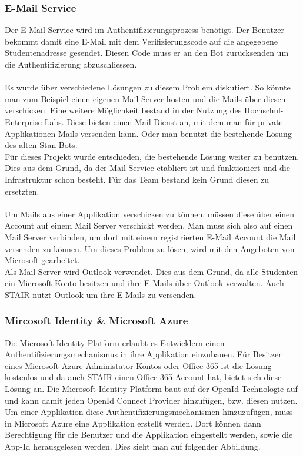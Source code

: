 \documentclass[a4paper, table]{article}
\begin{document}
\subsubsection{E-Mail Service}
Der E-Mail Service wird im Authentifizierungsprozess benötigt.
Der Benutzer bekommt damit eine E-Mail mit dem Verifizierungscode auf die angegebene Studentenadresse gesendet.
Diesen Code muss er an den Bot zurücksenden um die Authentifizierung abzuschliessen.\\\\
Es wurde über verschiedene Lösungen zu diesem Problem diskutiert.
So könnte man zum Beispiel einen eigenen Mail Server hosten und die Mails über diesen verschicken.
Eine weitere Möglichkeit bestand in der Nutzung des Hochschul-Enterprise-Labs.
Diese bieten einen Mail Dienst an, mit dem man für private Applikationen Mails versenden kann.
Oder man benutzt die bestehende Lösung des alten Stan Bots.\\
Für dieses Projekt wurde entschieden, die bestehende Lösung weiter zu benutzen.
Dies aus dem Grund, da der Mail Service etabliert ist und funktioniert und die Infrastruktur schon besteht.
Für das Team bestand kein Grund diesen zu ersetzten.\\\\
Um Mails aus einer Applikation verschicken zu können, müssen diese über einen Account auf einem Mail Server verschickt werden.
Man muss sich also auf einen Mail Server verbinden, um dort mit einem registrierten E-Mail Account die Mail versenden zu können.
Um dieses Problem zu lösen, wird mit den Angeboten von Microsoft gearbeitet.\\
Als Mail Server wird Outlook verwendet.
Dies aus dem Grund, da alle Studenten ein Microsoft Konto besitzen und ihre E-Mails über Outlook verwalten.
Auch STAIR nutzt Outlook um ihre E-Mails zu versenden.

\subsubsection*{Mircosoft Identity \& Microsoft Azure}
Die Microsoft Identity Platform erlaubt es Entwicklern einen Authentifizierungsmechanismus in ihre Applikation einzubauen.
Für Besitzer eines Microsoft Azure Administator Kontos oder Office 365 ist die Lösung kostenlos und da auch STAIR einen Office 365 Account hat,
bietet sich diese Lösung an.
Die Microsoft Identity Platform baut auf der OpenId Technologie auf und kann damit jeden OpenId Connect Provider hinzufügen, bzw. diesen nutzen.
Um einer Applikation diese Authentifizierungsmechanismen hinzuzufügen, muss in Microsoft Azure eine Applikation erstellt werden.
Dort können dann Berechtigung für die Benutzer und die Applikation eingestellt werden, sowie die App-Id herausgelesen werden. \autocite{noauthor_introduction_nodate}
Dies sieht man auf folgender Abbildung.
\end{document}
